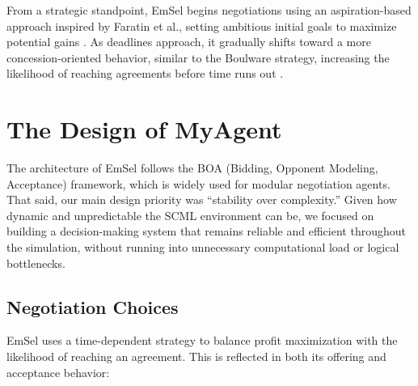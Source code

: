 \documentclass[a4paper,11pt]{article}
\begin{document}
	From a strategic standpoint, EmSel begins negotiations using an aspiration-based approach inspired by Faratin et al., setting ambitious initial goals to maximize potential gains \cite{ref5}. As deadlines approach, it gradually shifts toward a more concession-oriented behavior, similar to the Boulware strategy, increasing the likelihood of reaching agreements before time runs out \cite{ref6}.
	
	\section{The Design of MyAgent}
	
	The architecture of EmSel follows the BOA (Bidding, Opponent Modeling, Acceptance) framework, which is widely used for modular negotiation agents. That said, our main design priority was ``stability over complexity.'' Given how dynamic and unpredictable the SCML environment can be, we focused on building a decision-making system that remains reliable and efficient throughout the simulation, without running into unnecessary computational load or logical bottlenecks.
	
	\subsection{Negotiation Choices}
	
	EmSel uses a time-dependent strategy to balance profit maximization with the likelihood of reaching an agreement. This is reflected in both its offering and acceptance behavior:
	
\end{document}
